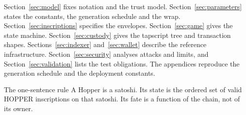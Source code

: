 Section~\ref{sec:model} fixes notation and the trust model.
Section~\ref{sec:parameters} states the constants, the generation schedule
and the wrap. Section~\ref{sec:inscriptions} specifies the envelopes.
Section~\ref{sec:game} gives the state machine.
Section~\ref{sec:custody} gives the tapscript tree and transaction shapes.
Sections~\ref{sec:indexer} and~\ref{sec:wallet} describe the reference
infrastructure. Section~\ref{sec:security} analyses attacks and limits, and
Section~\ref{sec:validation} lists the test obligations. The appendices
reproduce the generation schedule and the deployment constants.

\begin{invariant}{The one-sentence rule}
A Hopper is a satoshi. Its state is the ordered set of valid HOPPER
inscriptions on that satoshi. Its fate is a function of the chain, not of
its owner.
\end{invariant}

